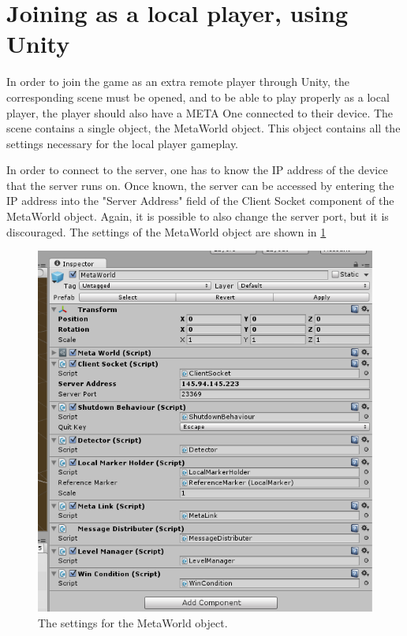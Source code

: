 \documentclass{report}
\begin{document}
\section*{Joining as a local player, using Unity}
	In order to join the game as an extra remote player through Unity, the 
	corresponding scene must be opened, and to be able
	to play properly as a local player, the player should also have a META One
	connected to their device. The scene contains a single object, the MetaWorld object. This object
	contains all the settings necessary for the local player gameplay.
	
	In order to connect to the server, one has to know the IP address of the
	device that the server runs on. Once known, the server can be accessed by
	entering the IP address into the "Server Address" field of the Client Socket
	component of the MetaWorld object. Again, it is possible to also change the
	server port, but it is discouraged. The settings of the MetaWorld object
	are shown in \ref{fig:metaworld}
	
	\begin{figure}[!ht]
	    \centering
	    \includegraphics[scale = 0.6]{MetaWorld}
	    \caption{The settings for the MetaWorld object.}
	    \label{fig:metaworld}
	\end{figure}
\end{document}
